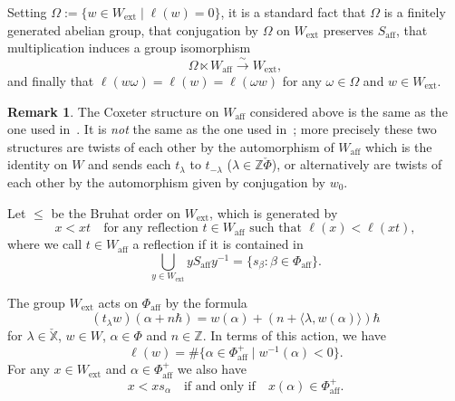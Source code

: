 \documentclass[11pt]{amsart}
\numberwithin{equation}{section}
\theoremstyle{plain}
\theoremstyle{definition}
\newtheorem{rmk}[thm]{Remark}
\newcommand{\X}{{\mathbb X}}
\newcommand{\Xd}{\check{\X}}
\newcommand{\Z}{{\mathbb Z}}
\newcommand{\simto}{\xrightarrow{\sim}}
\newcommand{\ex}{\mathrm{ext}}
\newcommand{\af}{\mathrm{aff}}
\begin{document}
Setting $\Omega := \{w \in W_\ex \mid \ell(w)=0\}$, it is a standard fact that $\Omega$ is a finitely generated abelian group, that conjugation by $\Omega$ on $W_\ex$ preserves $S_\af$, that multiplication induces a group isomorphism
\[
\Omega \ltimes W_\af \simto W_\ex,
\]
and finally that $\ell(w\omega) = \ell(w) = \ell(\omega w)$ for any $\omega \in \Omega$ and $w \in W_\ex$.

\begin{rmk}
\label{rmk:Coxeter-structures}
The Coxeter structure on $W_\af$ considered above is the same as the one used in~\cite{adr}. It is \emph{not} the same as the one used in~\cite{AR18}; more precisely these two structures are twists of each other by the automorphism of $W_\af$ which is the identity on $W$ and sends each $t_\lambda$ to $t_{-\lambda}$ ($\lambda \in \Z\check{\Phi}$), or alternatively are twists of each other by the automorphism given by conjugation by $w_0$.
\end{rmk}

Let $\leq$ be the Bruhat order on $W_\ex$, which is generated by 
\[
x< xt \quad \text{for any reflection $t\in W_\af$ such that $\ell(x)<\ell(xt)$},
\]
where we call $t\in W_\af$ a reflection if it is contained in
\[
\bigcup_{y\in W_\ex} yS_\af y^{-1} = \{s_\beta : \beta \in \Phi_\af\}.
\] 

The group $W_\ex$ acts on $\Phi_\af$ by the formula
\begin{equation}
\label{eq:act-aff}
(t_\lambda w)(\alpha+n\hbar)=w(\alpha)+(n+\langle \lambda,w(\alpha)\rangle)\hbar 
\end{equation}
for $\lambda\in \Xd$, $w\in W$, $\alpha \in \Phi$ and $n \in \Z$.
In terms of this action, we have
\[
\ell(w) = \#\{\alpha \in \Phi_\af^+ \mid w^{-1}(\alpha)<0\}.
\]
For any $x\in W_\ex$ and $\alpha\in \Phi^+_\af$ we also have
\begin{equation}
\label{eq:Bruhat}
x < xs_\alpha \quad \text{if and only if}\quad x(\alpha)\in \Phi^+_\af. 
\end{equation}


\end{document}
